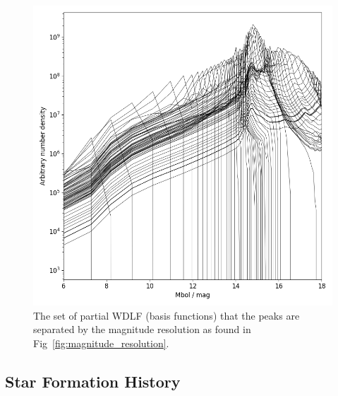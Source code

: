 \documentclass[fleqn,usenatbib]{mnras}
\begin{document}
\begin{figure}
    \includegraphics[width=\columnwidth]{figures/fig_05_basis_pwdlf.png}
    \caption{The set of partial WDLF (basis functions) that the peaks are separated by the magnitude resolution as found in Fig~\ref{fig:magnitude_resolution}.}
    \label{fig:basis_pwdlf}
\end{figure}

\subsection{Star Formation History}
\end{document}
